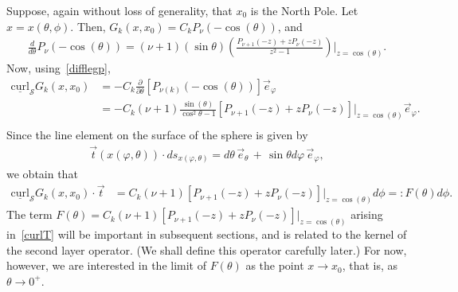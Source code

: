 \documentclass[final]{siamltex}
\newcommand{\C}{C_k}
\renewcommand{\S} {\mathcal{S}}
\begin{document}
Suppose, again without loss of generality, that $x_0$ is the North Pole.  Let 
$x=x(\theta,\phi)$. Then, $G_k(x,x_0) = \C P_\nu(-\cos(\theta))$, and
\begin{align}
  \label{difflegp} 
  \frac{d}{d\theta} P_\nu(-\cos(\theta)) =  
    (\nu+1)(\sin\theta) \left( \frac{ P_{\nu+1}(-z) +z
        P_{\nu}(-z)}{z^2-1} 
   \right)\vert_{z=\cos(\theta)}.
\end{align}
Now, using~\eqref{difflegp}, 
\begin{align*}
  \underline{\mbox{curl}}_{\S} G_k(x,x_0)&=-
  \C\frac{\partial}{\partial \theta} \left[P_{\nu(k)}(-\cos(\theta))
  \right] \vec{e}_\varphi \\
  &=-\C(\nu+1)\frac{\sin(\theta)}{\cos^2\theta -1} 
    \left[ P_{\nu+1}(-z) + 
   z 
    P_\nu(-z)\right]\vert_{z=\cos(\theta)} \vec{e}_\varphi. \\
\end{align*}
Since the line element on the surface of the sphere is given by
\begin{align*}
  \vec{t}(x(\varphi,\theta))\cdot ds_{x(\varphi,\theta)} = 
    d\theta\,\vec{e}_{\theta} \,+
    \, \sin\theta d\varphi \,\vec{e}_{\varphi}, 
\end{align*} 
we obtain that
\begin{align}
  \label{curlT}
  \underline{\mbox{curl}}_{\S} G_k(x,x_0)\cdot \vec{t} &= 
  \C (\nu+1)  \left[ P_{\nu+1}(-z) + 
  z P_\nu(-z)\right]\vert_{z=\cos(\theta)} d\phi =: F(\theta)d\phi.
\end{align}
The term $F(\theta)= \C (\nu+1)  \left[ P_{\nu+1}(-z) + z
P_\nu(-z)\right]\vert_{z=\cos(\theta)}$ arising in~\eqref{curlT} will be
important in subsequent sections, and is related to the kernel of the
second layer operator. (We shall define this operator carefully later.)
For now, however, we are interested in the limit of $F(\theta)$ as the
point $x\rightarrow x_0$, that is, as $\theta \rightarrow 0^+$.  
\end{document}
